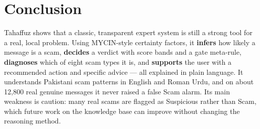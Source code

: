 \documentclass[11pt,a4paper]{article}
\begin{document}
\section{Conclusion}
Tahaffuz shows that a classic, transparent expert system is still a strong tool for a real, local
problem. Using MYCIN-style certainty factors, it \textbf{infers} how likely a message is a scam,
\textbf{decides} a verdict with score bands and a gate meta-rule, \textbf{diagnoses} which of eight
scam types it is, and \textbf{supports} the user with a recommended action and specific advice ---
all explained in plain language. It understands Pakistani scam patterns in English and Roman Urdu,
and on about 12{,}800 real genuine messages it never raised a false Scam alarm. Its main weakness
is caution: many real scams are flagged as Suspicious rather than Scam, which future work on the
knowledge base can improve without changing the reasoning method.
\end{document}
